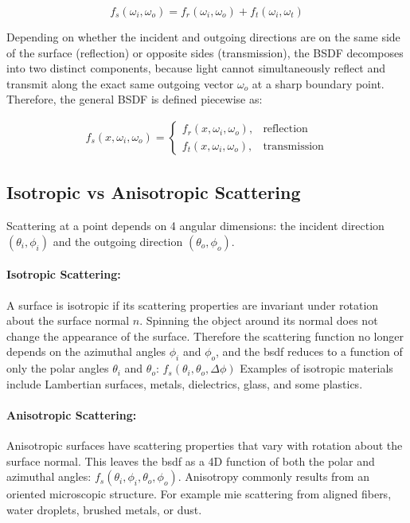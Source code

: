 \[
    f_s(\omega_i, \omega_o) = f_r(\omega_i, \omega_o) + f_t(\omega_i, \omega_t)
\]

Depending on whether the incident and outgoing directions are on the same side 
of the surface (reflection) or opposite sides (transmission), 
the BSDF decomposes into two distinct components,
because light cannot simultaneously reflect and transmit 
along the exact same outgoing vector $\omega_o$ at a sharp boundary point.
Therefore, the general BSDF is defined piecewise as:

\begin{align}
    f_s(x, \omega_i, \omega_o) = 
    \begin{cases} 
      f_r(x, \omega_i, \omega_o), & \text{reflection} \\ 
      f_t(x, \omega_i, \omega_o), & \text{transmission}
    \end{cases}
\end{align}

\subsection{Isotropic vs Anisotropic Scattering}\label{subsec:isotropic-anisotropic-scattering}

Scattering at a point depends on 4 angular dimensions: 
the incident direction $(\theta_i, \phi_i)$ and the outgoing direction $(\theta_o, \phi_o)$.
~\cite{Pharr2016PBR,10.1145/133994.134078}

\paragraph{Isotropic Scattering:}

A surface is isotropic if its scattering properties are invariant under rotation about the surface normal $n$.
Spinning the object around its normal does not change the appearance of the surface.
Therefore the scattering function no longer depends on the azimuthal angles $\phi_i$ and $\phi_o$,
and the \gls{bsdf} reduces to a function of only the polar angles $\theta_i$ and $\theta_o$: 
$f_s(\theta_i, \theta_o, \Delta\phi)$
Examples of isotropic materials include Lambertian surfaces, metals, dielectrics, glass, and some plastics.

\paragraph{Anisotropic Scattering:}

Anisotropic surfaces have scattering properties that vary with rotation about the surface normal.
This leaves the \gls{bsdf} as a 4D function of both the polar and azimuthal angles:
$f_s(\theta_i,\phi_i,\theta_o,\phi_o)$.
Anisotropy commonly results from an oriented microscopic structure.
For example mie scattering from aligned fibers, water droplets, brushed metals, or dust.

